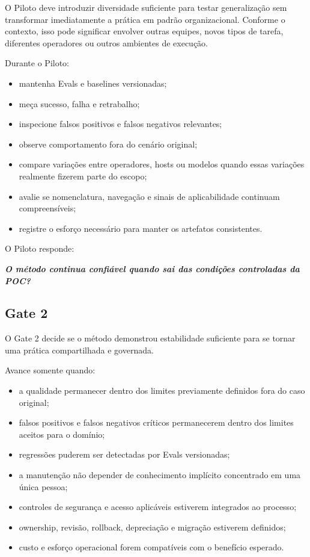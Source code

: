 \documentclass[
  10pt,
  a4paper,
  oneside]{book}
\providecommand{\tightlist}{%
  \setlength{\itemsep}{0pt}\setlength{\parskip}{0pt}}
\renewenvironment{quote}
  {\def\FrameCommand{\fboxsep=10pt\colorbox{LightBlue}}%
   \MakeFramed{\advance\hsize-\width\FrameRestore}\itshape}
  {\endMakeFramed}
\begin{document}
O Piloto deve introduzir diversidade suficiente para testar
generalização sem transformar imediatamente a prática em padrão
organizacional. Conforme o contexto, isso pode significar envolver
outras equipes, novos tipos de tarefa, diferentes operadores ou outros
ambientes de execução.

Durante o Piloto:

\begin{itemize}
\tightlist
\item
  mantenha Evals e baselines versionadas;
\item
  meça sucesso, falha e retrabalho;
\item
  inspecione falsos positivos e falsos negativos relevantes;
\item
  observe comportamento fora do cenário original;
\item
  compare variações entre operadores, hosts ou modelos quando essas
  variações realmente fizerem parte do escopo;
\item
  avalie se nomenclatura, navegação e sinais de aplicabilidade continuam
  compreensíveis;
\item
  registre o esforço necessário para manter os artefatos consistentes.
\end{itemize}

O Piloto responde:

\begin{quote}
\textbf{O método continua confiável quando sai das condições controladas
da POC?}
\end{quote}

\hypertarget{gate-2}{%
\subsection{Gate 2}\label{gate-2}}

O Gate 2 decide se o método demonstrou estabilidade suficiente para se
tornar uma prática compartilhada e governada.

Avance somente quando:

\begin{itemize}
\tightlist
\item
  a qualidade permanecer dentro dos limites previamente definidos fora
  do caso original;
\item
  falsos positivos e falsos negativos críticos permanecerem dentro dos
  limites aceitos para o domínio;
\item
  regressões puderem ser detectadas por Evals versionadas;
\item
  a manutenção não depender de conhecimento implícito concentrado em uma
  única pessoa;
\item
  controles de segurança e acesso aplicáveis estiverem integrados ao
  processo;
\item
  ownership, revisão, rollback, depreciação e migração estiverem
  definidos;
\item
  custo e esforço operacional forem compatíveis com o benefício
  esperado.
\end{itemize}
\end{document}

